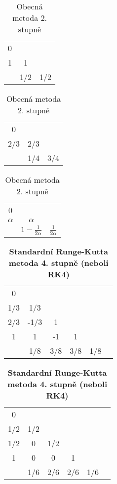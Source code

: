 \documentclass[12pt, a4paper,
 twoside,        %
 openright
]{report}
\begin{document}
\begin{table}[H]
    \parbox{.3\linewidth}{
        \centering
        \caption[Butcherova tabulka Heunovy metody]{Heunova metoda}
        \begin{tabular}{c | c c}
            0 & \\
            1 & 1\\
            \hline
            & 1/2 & 1/2 \\
        \end{tabular}
    }
    \hfill
    \parbox{.3\linewidth}{
        \centering
        \caption[Butcherova tabulka Ralstonovy metody]{Ralstonova metoda}
        \begin{tabular}{c | c c}
            0 & \\
            2/3 & 2/3\\
            \hline
            & 1/4 & 3/4 \\
        \end{tabular}
    }
    \hfill
    \parbox{.3\linewidth}{
        \centering
        \caption[Butcherova tabulka obecné metody 2. stupně]{Obecná metoda 2. stupně}
        \begin{tabular}{c | c c}
            0 & \\
            $\alpha$ & $\alpha$\\
            \hline
            & $1 - \frac{1}{2\alpha}$ & $\frac{1}{2\alpha}$ \\
        \end{tabular}
    }
\end{table}

\begin{table}[H]
    \parbox{.45\linewidth}{
        \centering
        \caption[Butcherova tabulka Simpsonova pravidla 3/8]{Simpsonovo pravidlo 3/8}
        \begin{tabular}{c | c c c c c}
            0 & \\
            1/3 & 1/3\\
            2/3 & -1/3 & 1\\
            1 & 1 & -1 & 1\\
            \hline
            & 1/8 & 3/8 & 3/8 & 1/8 \\
        \end{tabular}
    }
    \hfill
    \parbox{.45\linewidth}{
        \centering
        \caption[Butcherova tabulka RK4]{\textbf{Standardní Runge-Kutta metoda 4. stupně (neboli RK4)}}
        \begin{tabular}{c | c c c c c}
            0 & \\
            1/2 & 1/2\\
            1/2 & 0 & 1/2\\
            1 & 0 & 0 & 1\\
            \hline
            & 1/6 & 2/6 & 2/6 & 1/6 \\
        \end{tabular}
    }
\end{table}
\end{document}
